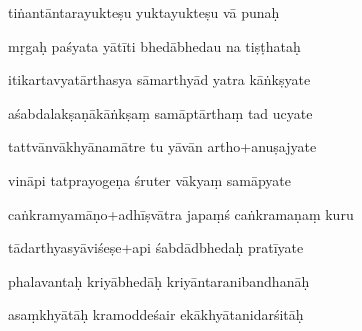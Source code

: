 \documentclass[article,12pt,a4paper]{memoir}%
\newcounter{parCount}
\begin{document}
	  
	  \pstart {} tiṅantāntarayukteṣu yuktayukteṣu vā punaḥ 
	{}
	\pend%
      

	  
	  \pstart \leavevmode%
	mṛgaḥ paśyata yātīti bhedābhedau na tiṣṭhataḥ 
	{}
	\pend%
      

	  
	  \pstart {} itikartavyatārthasya sāmarthyād yatra kāṅkṣyate 
	{}
	\pend%
      

	  
	  \pstart \leavevmode%
	aśabdalakṣaṇākāṅkṣaṃ samāptārthaṃ tad ucyate 
	{}
	\pend%
      

	  
	  \pstart {} tattvānvākhyānamātre tu yāvān artho+anuṣajyate 
	{}
	\pend%
      

	  
	  \pstart \leavevmode%
	vināpi tatprayogeṇa śruter vākyaṃ samāpyate 
	{}
	\pend%
      

	  
	  \pstart {} caṅkramyamāṇo+adhīṣvātra japaṃś caṅkramaṇaṃ kuru 
	{}
	\pend%
      

	  
	  \pstart \leavevmode%
	tādarthyasyāviśeṣe+api śabdādbhedaḥ pratīyate 
	{}
	\pend%
      

	  
	  \pstart {} phalavantaḥ kriyābhedāḥ kriyāntaranibandhanāḥ 
	{}
	\pend%
      

	  
	  \pstart \leavevmode%
	asaṃkhyātāḥ kramoddeśair ekākhyātanidarśitāḥ 
	{}
	\pend%
      
\end{document}
